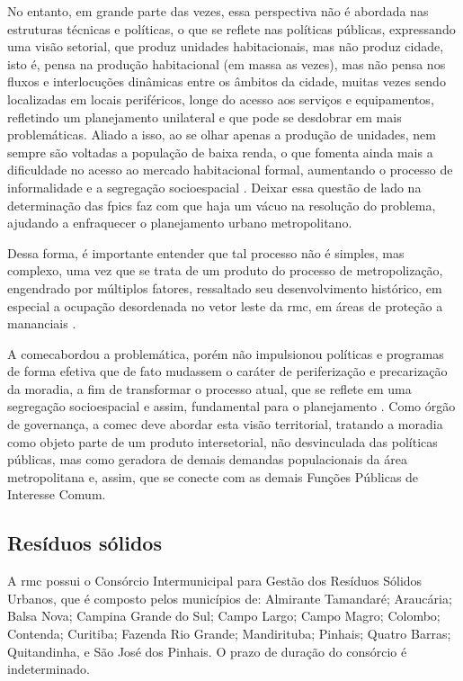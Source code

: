 	No entanto, em grande parte das vezes, essa perspectiva não é abordada nas estruturas técnicas e políticas, o que se reflete nas políticas públicas, expressando uma visão setorial, que produz unidades habitacionais, mas não produz cidade, isto é, pensa na produção habitacional (em massa as vezes), mas não pensa nos fluxos e interlocuções dinâmicas entre os âmbitos da cidade, muitas vezes sendo localizadas em locais periféricos, longe do acesso aos serviços e equipamentos, refletindo um planejamento unilateral e que pode se desdobrar em mais problemáticas. Aliado a isso, ao se olhar apenas a produção de unidades, nem sempre são voltadas a população de baixa renda, o que fomenta ainda mais a dificuldade no acesso ao mercado habitacional formal, aumentando o processo de informalidade e a segregação socioespacial \cite[p. 37]{vaccari2018a}. Deixar essa questão de lado na determinação das \gls{fpic}s faz com que haja um vácuo na resolução do problema, ajudando a enfraquecer o planejamento urbano metropolitano.
	
	Dessa forma, é importante entender que tal processo não é simples, mas complexo, uma vez que se trata de um produto do processo de metropolização, engendrado por múltiplos fatores, ressaltado seu desenvolvimento histórico, em especial a ocupação desordenada no vetor leste da \gls{rmc}, em áreas de proteção a mananciais \cite[p. 40, 45]{vaccari2018a} \cite[p. 138--139]{lima2001a}.
	
	A \gls{comec}abordou a problemática, porém não impulsionou políticas e programas de forma efetiva que de fato mudassem o caráter de periferização e precarização da moradia, a fim de transformar o processo atual, que se reflete em uma segregação socioespacial e assim, fundamental para o planejamento \cite[p. 18]{vaccari2018a}. Como órgão de governança, a \gls{comec} deve abordar esta visão territorial, tratando a moradia como objeto parte de um produto intersetorial, não desvinculada das políticas públicas, mas como geradora de demais demandas populacionais da área metropolitana e, assim, que se conecte com as demais Funções Públicas de Interesse Comum. 
	
	\subsection{Resíduos sólidos}
	
	A \gls{rmc} possui o Consórcio Intermunicipal para Gestão dos Resíduos Sólidos Urbanos, que é composto pelos municípios de: Almirante Tamandaré; Araucária; Balsa Nova; Campina Grande do Sul; Campo Largo; Campo Magro; Colombo; Contenda; Curitiba; Fazenda Rio Grande; Mandirituba; Pinhais; Quatro Barras; Quitandinha, e São José dos Pinhais. O prazo de duração do consórcio é indeterminado.
	
